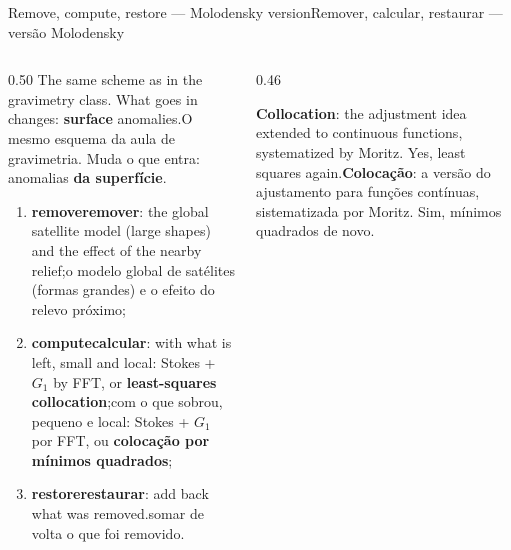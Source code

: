 \documentclass[aspectratio=169,11pt]{beamer}
\newcommand{\tr}[2]{\ifEN#2\else#1\fi}
\newcommand{\bnum}[1]{\textbf{\textcolor{mTeal}{#1}}}
\begin{document}
\begin{frame}{\tr{Remover, calcular, restaurar --- versão Molodensky}{Remove, compute, restore
  --- Molodensky version}}
  \begin{columns}[T]
    \begin{column}{0.50\textwidth}
      \tr{O mesmo esquema da aula de gravimetria. Muda o que entra: anomalias \bnum{da
      superfície}.}{The same scheme as in the gravimetry class. What goes in changes:
      \bnum{surface} anomalies.}
      \begin{enumerate}
        \setlength{\itemsep}{3pt}
        \item \textbf{\tr{remover}{remove}}: \tr{o modelo global de satélites (formas grandes)
              e o efeito do relevo próximo;}{the global satellite model (large shapes) and the
              effect of the nearby relief;}
        \item \textbf{\tr{calcular}{compute}}: \tr{com o que sobrou, pequeno e local: Stokes +
              $G_1$ por FFT, ou \bnum{colocação por mínimos quadrados};}{with what is left,
              small and local: Stokes + $G_1$ by FFT, or \bnum{least-squares collocation};}
        \item \textbf{\tr{restaurar}{restore}}: \tr{somar de volta o que foi
              removido.}{add back what was removed.}
      \end{enumerate}
    \end{column}
    \begin{column}{0.46\textwidth}
      \centering
      \medskip
      {\scriptsize\tr{\textbf{Colocação}: a versão do ajustamento para funções contínuas,
      sistematizada por Moritz. Sim, mínimos quadrados de novo.}{\textbf{Collocation}: the
      adjustment idea extended to continuous functions, systematized by Moritz. Yes, least
      squares again.}}
    \end{column}
  \end{columns}
\end{frame}
\end{document}
